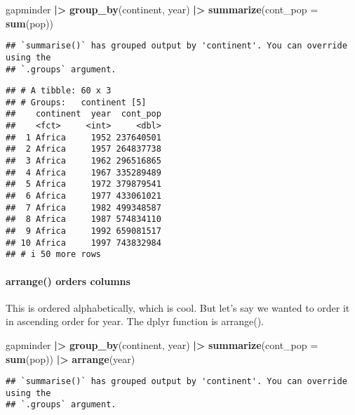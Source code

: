 \documentclass[
]{article}
\newenvironment{Shaded}{\begin{snugshade}}{\end{snugshade}}
\newcommand{\AttributeTok}[1]{\textcolor[rgb]{0.13,0.29,0.53}{#1}}
\newcommand{\FunctionTok}[1]{\textcolor[rgb]{0.13,0.29,0.53}{\textbf{#1}}}
\newcommand{\NormalTok}[1]{#1}
\newcommand{\SpecialCharTok}[1]{\textcolor[rgb]{0.81,0.36,0.00}{\textbf{#1}}}
\begin{document}
\begin{Shaded}
\begin{Highlighting}[]
\NormalTok{gapminder }\SpecialCharTok{|\textgreater{}}
 \FunctionTok{group\_by}\NormalTok{(continent, year) }\SpecialCharTok{|\textgreater{}}
 \FunctionTok{summarize}\NormalTok{(}\AttributeTok{cont\_pop =} \FunctionTok{sum}\NormalTok{(pop))}
\end{Highlighting}
\end{Shaded}

\begin{verbatim}
## `summarise()` has grouped output by 'continent'. You can override using the
## `.groups` argument.
\end{verbatim}

\begin{verbatim}
## # A tibble: 60 x 3
## # Groups:   continent [5]
##    continent  year  cont_pop
##    <fct>     <int>     <dbl>
##  1 Africa     1952 237640501
##  2 Africa     1957 264837738
##  3 Africa     1962 296516865
##  4 Africa     1967 335289489
##  5 Africa     1972 379879541
##  6 Africa     1977 433061021
##  7 Africa     1982 499348587
##  8 Africa     1987 574834110
##  9 Africa     1992 659081517
## 10 Africa     1997 743832984
## # i 50 more rows
\end{verbatim}

\paragraph{arrange() orders columns}\label{arrange-orders-columns}

This is ordered alphabetically, which is cool. But let's say we wanted
to order it in ascending order for year. The dplyr function is
arrange().

\begin{Shaded}
\begin{Highlighting}[]
\NormalTok{gapminder }\SpecialCharTok{|\textgreater{}}
 \FunctionTok{group\_by}\NormalTok{(continent, year) }\SpecialCharTok{|\textgreater{}}
 \FunctionTok{summarize}\NormalTok{(}\AttributeTok{cont\_pop =} \FunctionTok{sum}\NormalTok{(pop)) }\SpecialCharTok{|\textgreater{}}
 \FunctionTok{arrange}\NormalTok{(year)}
\end{Highlighting}
\end{Shaded}

\begin{verbatim}
## `summarise()` has grouped output by 'continent'. You can override using the
## `.groups` argument.
\end{verbatim}
\end{document}
